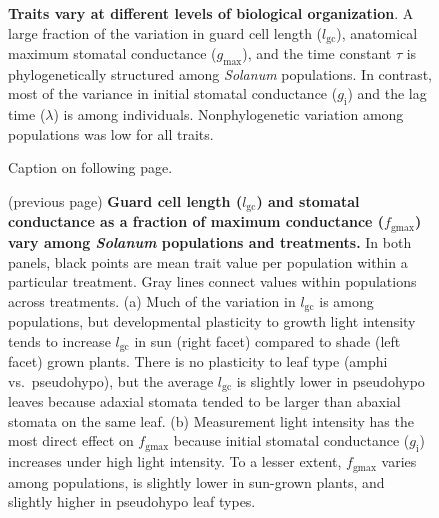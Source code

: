 \documentclass[
  letterpaper,
  DIV=11,
  numbers=noendperiod]{scrartcl}
\newcommand{\fgmax}{$f_\mathrm{gmax}$}
\newcommand{\gcl}{$l_\mathrm{gc}$}
\newcommand{\gi}{$g_\mathrm{i}$}
\newcommand{\gmax}{$g_\mathrm{max}$}
\begin{document}
\begin{figure}


\caption{\label{fig-variance}\textbf{Traits vary at different levels of biological organization}.
A large fraction of the variation in guard cell length (\gcl),
anatomical maximum stomatal conductance (\gmax), and the time constant
\(\tau\) is phylogenetically structured among \textit{Solanum}
populations. In contrast, most of the variance in initial stomatal
conductance (\gi) and the lag time (\(\lambda\)) is among individuals.
Nonphylogenetic variation among populations was low for all traits.}

\end{figure}%

\begin{figure}


\caption{\label{fig-accession-anatomy}Caption on following page.}

\end{figure}%

\addtocounter{figure}{-1}

\begin{figure}

\centering{

\mbox{}

}

\caption{\label{fig-accession-anatomy-cap}(previous page)
\textbf{Guard cell length (\gcl) and stomatal conductance as a fraction of maximum conductance (\fgmax) vary among \textit{Solanum} populations and treatments.}
In both panels, black points are mean trait value per population within
a particular treatment. Gray lines connect values within populations
across treatments. (a) Much of the variation in \gcl{} is among
populations, but developmental plasticity to growth light intensity
tends to increase \gcl{} in sun (right facet) compared to shade (left
facet) grown plants. There is no plasticity to leaf type (amphi
vs.~pseudohypo), but the average \gcl{} is slightly lower in pseudohypo
leaves because adaxial stomata tended to be larger than abaxial stomata
on the same leaf. (b) Measurement light intensity has the most direct
effect on \fgmax{} because initial stomatal conductance (\gi) increases
under high light intensity. To a lesser extent, \fgmax{} varies among
populations, is slightly lower in sun-grown plants, and slightly higher
in pseudohypo leaf types.}

\end{figure}%
\end{document}
